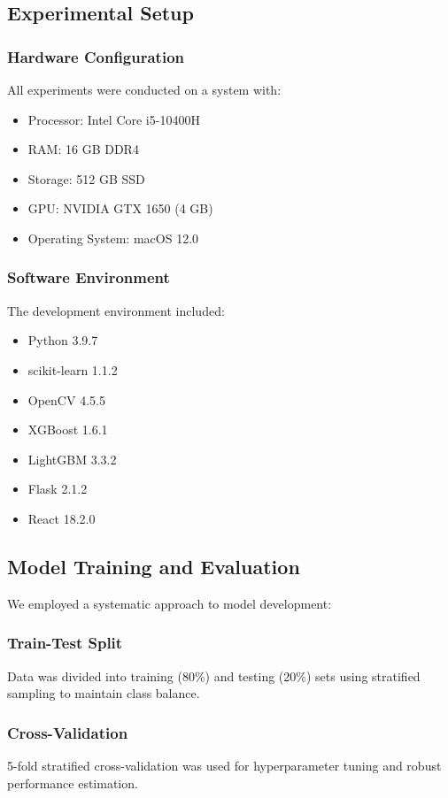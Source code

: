 \documentclass[conference]{IEEEtran}
\begin{document}
\subsection{Experimental Setup}

\subsubsection{Hardware Configuration}
All experiments were conducted on a system with:
\begin{itemize}
    \item Processor: Intel Core i5-10400H
    \item RAM: 16 GB DDR4
    \item Storage: 512 GB SSD
    \item GPU: NVIDIA GTX 1650 (4 GB)
    \item Operating System: macOS 12.0
\end{itemize}

\subsubsection{Software Environment}
The development environment included:
\begin{itemize}
    \item Python 3.9.7
    \item scikit-learn 1.1.2
    \item OpenCV 4.5.5
    \item XGBoost 1.6.1
    \item LightGBM 3.3.2
    \item Flask 2.1.2
    \item React 18.2.0
\end{itemize}

\subsection{Model Training and Evaluation}

We employed a systematic approach to model development:

\subsubsection{Train-Test Split}
Data was divided into training (80\%) and testing (20\%) sets using stratified sampling to maintain class balance.

\subsubsection{Cross-Validation}
5-fold stratified cross-validation was used for hyperparameter tuning and robust performance estimation.
\end{document}
